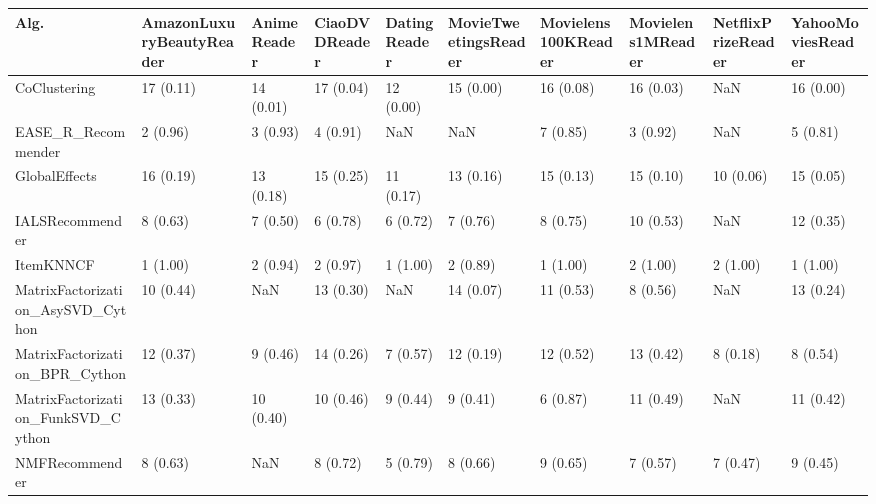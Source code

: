 \begin{tabular}{llllllllll}
\toprule
                               Alg. & AmazonLuxuryBeautyReader & AnimeReader & CiaoDVDReader & DatingReader & MovieTweetingsReader & Movielens100KReader & Movielens1MReader & NetflixPrizeReader & YahooMoviesReader \\
\midrule
                       CoClustering &                17 (0.11) &   14 (0.01) &     17 (0.04) &    12 (0.00) &            15 (0.00) &           16 (0.08) &         16 (0.03) &                NaN &         16 (0.00) \\
                 EASE\_R\_Recommender &                 2 (0.96) &    3 (0.93) &      4 (0.91) &          NaN &                  NaN &            7 (0.85) &          3 (0.92) &                NaN &          5 (0.81) \\
                      GlobalEffects &                16 (0.19) &   13 (0.18) &     15 (0.25) &    11 (0.17) &            13 (0.16) &           15 (0.13) &         15 (0.10) &          10 (0.06) &         15 (0.05) \\
                    IALSRecommender &                 8 (0.63) &    7 (0.50) &      6 (0.78) &     6 (0.72) &             7 (0.76) &            8 (0.75) &         10 (0.53) &                NaN &         12 (0.35) \\
                          ItemKNNCF &                 1 (1.00) &    2 (0.94) &      2 (0.97) &     1 (1.00) &             2 (0.89) &            1 (1.00) &          2 (1.00) &           2 (1.00) &          1 (1.00) \\
  MatrixFactorization\_AsySVD\_Cython &                10 (0.44) &         NaN &     13 (0.30) &          NaN &            14 (0.07) &           11 (0.53) &          8 (0.56) &                NaN &         13 (0.24) \\
     MatrixFactorization\_BPR\_Cython &                12 (0.37) &    9 (0.46) &     14 (0.26) &     7 (0.57) &            12 (0.19) &           12 (0.52) &         13 (0.42) &           8 (0.18) &          8 (0.54) \\
 MatrixFactorization\_FunkSVD\_Cython &                13 (0.33) &   10 (0.40) &     10 (0.46) &     9 (0.44) &             9 (0.41) &            6 (0.87) &         11 (0.49) &                NaN &         11 (0.42) \\
                     NMFRecommender &                 8 (0.63) &         NaN &      8 (0.72) &     5 (0.79) &             8 (0.66) &            9 (0.65) &          7 (0.57) &           7 (0.47) &          9 (0.45) \\

\end{tabular}
